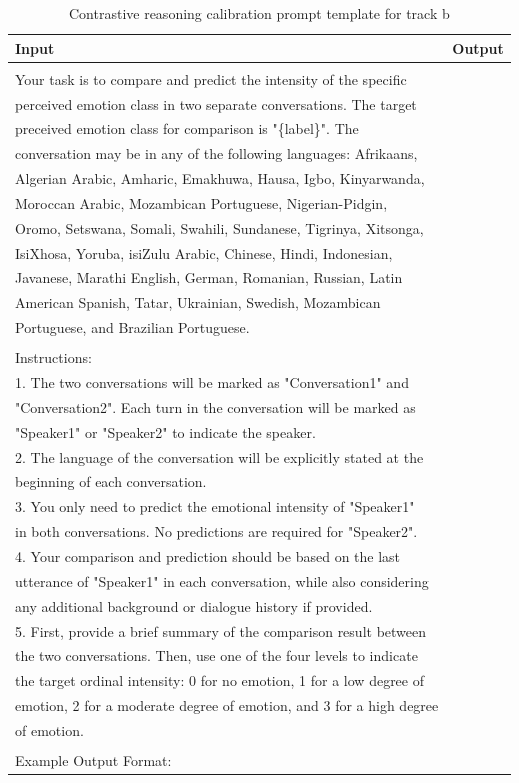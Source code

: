 \documentclass[11pt]{article}
\begin{document}
\begin{table}[]
\caption{Contrastive reasoning calibration prompt template for track b}
\label{tab:CRC_trackb_temp}
\begin{tabular}{l|l}
\hline
\textbf{Input} &
  \textbf{Output} \\ \hline
\begin{tabular}[c]{@{}l@{}}Task Description: \\ Your task is to compare and predict the intensity of the specific \\ perceived emotion class in two separate conversations. The target \\ preceived emotion class for comparison is "\{label\}". The \\ conversation may be in any of the following languages: Afrikaans, \\ Algerian Arabic, Amharic, Emakhuwa, Hausa, Igbo, Kinyarwanda, \\ Moroccan Arabic, Mozambican Portuguese, Nigerian-Pidgin, \\ Oromo, Setswana, Somali, Swahili, Sundanese, Tigrinya, Xitsonga, \\ IsiXhosa, Yoruba, isiZulu Arabic, Chinese, Hindi, Indonesian, \\ Javanese, Marathi English, German, Romanian, Russian, Latin \\ American Spanish, Tatar, Ukrainian, Swedish, Mozambican \\ Portuguese, and Brazilian Portuguese. \\ \\ Instructions: \\ 1. The two conversations will be marked as "Conversation1" and \\ "Conversation2". Each turn in the conversation will be marked as \\ "Speaker1" or "Speaker2" to indicate the speaker. \\ 2. The language of the conversation will be explicitly stated at the \\ beginning of each conversation. \\ 3. You only need to predict the emotional intensity of "Speaker1" \\ in both conversations. No predictions are required for "Speaker2". \\ 4. Your comparison and prediction should be based on the last \\ utterance of "Speaker1" in each conversation, while also considering \\ any additional background or dialogue history if provided. \\ 5. First, provide a brief summary of the comparison result between \\ the two conversations. Then, use one of the four levels to indicate \\ the target ordinal intensity:  0 for no emotion, 1 for a low degree of \\ emotion, 2 for a moderate degree of emotion, and 3 for a high degree \\ of emotion. \\ \\ Example Output Format: \\ 
\end{tabular}
\end{table}
\end{document}
